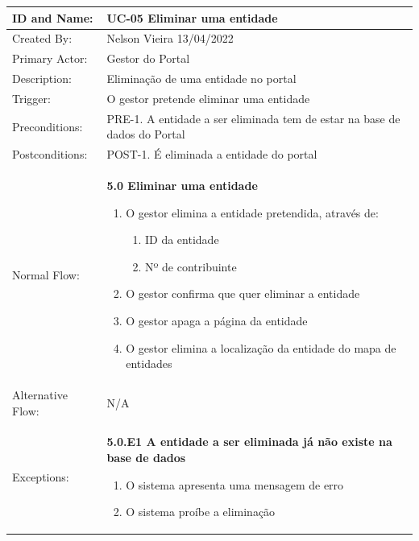 \documentclass{scrreprt}
\begin{document}
\begin{table}[H]
    \centering
    \begin{adjustbox}{width=1.2\textwidth,center=\textwidth}
        \begin{tabular}{|m{4cm}|m{12cm}|}
            \hline
            ID and Name: & UC-05 Eliminar uma entidade \\
            \hline
            Created By: & Nelson Vieira 13/04/2022 \\
            \hline
            Primary Actor: & Gestor do Portal \\
            \hline
            Description: & Eliminação de uma entidade no portal \\
            \hline
            Trigger: & O gestor pretende eliminar uma entidade \\
            \hline
            Preconditions: & PRE-1. A entidade a ser eliminada tem de estar na base de dados do Portal \\
            \hline
            Postconditions: & POST-1. É eliminada a entidade do portal \\
            \hline
            Normal Flow: & \textbf{5.0 Eliminar uma entidade}
            \begin{enumerate}
                \item O gestor elimina a entidade pretendida, através de:
                \begin{enumerate}
                    \item ID da entidade
                    \item Nº de contribuinte
                \end{enumerate}
                \item O gestor confirma que quer eliminar a entidade
                \item O gestor apaga a página da entidade
                \item O gestor elimina a localização da entidade do mapa de entidades
            \end{enumerate} \\
            \hline
            Alternative Flow: & N/A \\
            \hline
            Exceptions: & \textbf{5.0.E1  A entidade a ser eliminada já não existe na base de dados}
            \begin{enumerate}
                \item O sistema apresenta uma mensagem de erro
                \item O sistema proíbe a eliminação

\end{enumerate}
\end{tabular}
\end{adjustbox}
\end{table}
\end{document}
